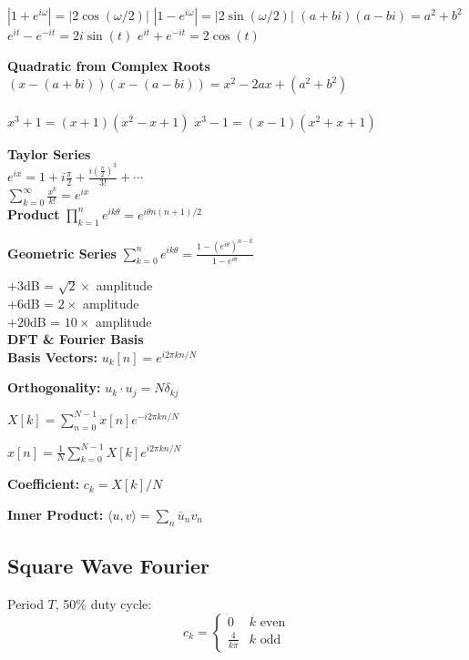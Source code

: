 \documentclass[8pt,landscape,a4paper]{article}
\newcommand{\important}[1]{\colorbox{yellow!25}{$\displaystyle #1$}}
\begin{document}
\begin{multicols}{4}
{\textbf{}
\begin{multicols}{2}
    $|1 + e^{i\omega}| = |2\cos(\omega/2)|$
$|1 - e^{i\omega}| = |2\sin(\omega/2)|$
$(a+bi)(a-bi) = a^2 + b^2$
$e^{it} - e^{-it} = 2i\sin(t)$
$e^{it} + e^{-it} = 2\cos(t)$ \\
\end{multicols}

\textbf{Quadratic from Complex Roots \\}
$(x-(a+bi))(x-(a-bi)) = x^2 - 2ax + (a^2+b^2)$ \\
\textbf{\\}
$x^3 + 1 = (x+1)(x^2-x+1)$
$x^3 - 1 = (x-1)(x^2+x+1)$

\begin{multicols}{2}
\textbf{Taylor Series}\\
$e^{ix} = 1 + i\frac{\pi}{2} + \frac{i(\frac{\pi}{2})^3}{3!} + \cdots$ \\
\important{\sum_{k=0}^{\infty} \frac{x^k}{k!} = e^{ix}}\\
\textbf{Product} $\prod_{k=1}^n e^{ik\theta} = e^{i\theta n(n+1)/2}$

\textbf{Geometric Series}
\important{\sum_{k=0}^{n} e^{ik\theta} = \frac{1-{(e^{i\theta})}^{n-k}}{1-e^{i\theta}}}
\end{multicols}}
$+3$dB = $\sqrt{2}\times$ amplitude\\
$+6$dB = $2\times$ amplitude\\
$+20$dB = $10\times$ amplitude\\

\textbf{DFT \& Fourier Basis}\\
\textbf{Basis Vectors:} $u_k[n] = e^{i2\pi kn/N}$

\textbf{Orthogonality:} $u_k \cdot u_j = N\delta_{kj}$

\important{X[k] = \sum_{n=0}^{N-1} x[n]e^{-i2\pi kn/N}}

\important{x[n] = \frac{1}{N}\sum_{k=0}^{N-1} X[k]e^{i2\pi kn/N}}

\textbf{Coefficient:} $c_k = X[k]/N$

\textbf{Inner Product:} $\langle u,v \rangle = \sum_n \bar{u}_n v_n$







\subsection*{Square Wave Fourier}
Period $T$, 50\% duty cycle:
$$c_k = \begin{cases}
0 & k \text{ even} \\
\frac{4}{k\pi} & k \text{ odd}
\end{cases}$$


\end{multicols}
\end{document}
